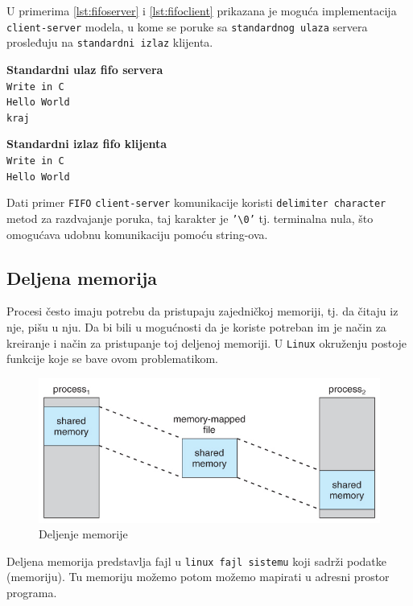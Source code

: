 \documentclass[a4paper, 11pt]{article}
\newcommand{\scode}[3] {
	\hspace{.06\textwidth} 
	\begin{minipage}[t]{.88\textwidth} %
		\begin{mdframed}[topline=true,bottomline=true,leftline=true,rightline=true,backgroundcolor=gray!22, linecolor=gray!60!black,roundcorner=1mm]
			 

	\begin{center}
		\caption{\textbf{Primer \ref{lst:#3}:} #2}
	\end{center}
	\end{mdframed}
	\end{minipage}

}
\newcommand{\stdio}[4] {
	\hspace{.06\textwidth} 
	\begin{minipage}[t]{.88\textwidth} %
		\begin{mdframed}[backgroundcolor=black!7,topline=true,bottomline=true,leftline=true,rightline=true,roundcorner=1mm]
		\begin{minipage}[t]{.5\textwidth} %
			\textbf{#1} \\
				\texttt{#3}
		\end{minipage}
		\begin{minipage}[t]{.5\textwidth} %
			\textbf{#2} \\
				\texttt{#4}
		\end{minipage}
		\end{mdframed}
	\end{minipage}
	\vspace{3mm} 
}
\begin{document}
\newpage

U primerima \ref{lst:fifoserver} i \ref{lst:fifoclient} prikazana je moguća implementacija \texttt{client-server} modela, u kome se poruke sa \texttt{standardnog ulaza} servera prosleđuju na \texttt{standardni izlaz} klijenta.

\vspace{2mm} 
\scode{fifo_server.c}{Fifo server}{fifoserver}

\scode{fifo_client.c}{Fifo klijent}{fifoclient}
\stdio{Standardni ulaz fifo servera}{Standardni izlaz fifo klijenta}{Write in C \\ Hello World \\ kraj}{Write in C \\ Hello World}
\vspace{2mm} 

Dati primer \texttt{FIFO} \texttt{client-server} komunikacije koristi \texttt{delimiter character} metod za razdvajanje poruka, taj karakter je \texttt{'\textbackslash0'} tj. terminalna nula, što omogućava udobnu komunikaciju pomoću string-ova. 

\newpage

\subsection{Deljena memorija}
Procesi često imaju potrebu da pristupaju zajedničkoj memoriji, tj. da čitaju iz nje, pišu u nju. 
Da bi bili u mogućnosti da je koriste potreban im je način za kreiranje i način za pristupanje toj deljenoj memoriji. U \texttt{Linux} okruženju postoje funkcije koje se bave ovom problematikom.

\begin{figure}[h]
	\centering
	\includegraphics[width=.7\textwidth]{shm.jpg} %
	\caption{Deljenje memorije}
	\label{fig:shm}
\end{figure}

Deljena memorija predstavlja fajl u \texttt{linux fajl sistemu} koji sadrži podatke (memoriju). Tu memoriju možemo potom možemo mapirati u adresni prostor programa. 
\end{document}
